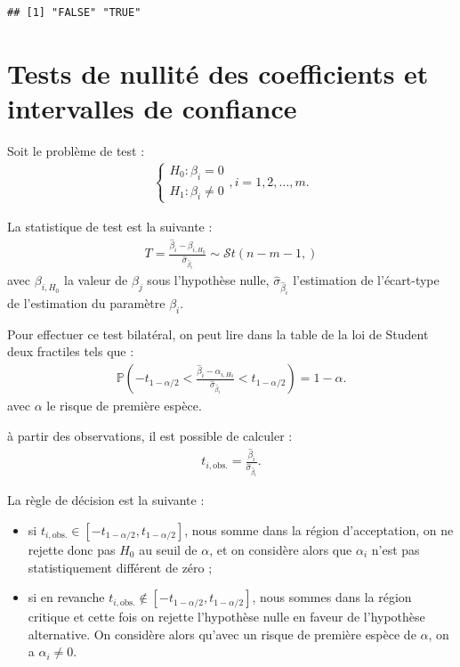 \documentclass[
  11pt,
]{book}
\providecommand{\tightlist}{%
  \setlength{\itemsep}{0pt}\setlength{\parskip}{0pt}}
\numberwithin{equation}{section}
\numberwithin{countremarque}{section}
\begin{document}
\begin{lstlisting}
## [1] "FALSE" "TRUE"
\end{lstlisting}

\hypertarget{regressions_tests}{%
\section{Tests de nullité des coefficients et intervalles de confiance}\label{regressions_tests}}

Soit le problème de test :
\begin{align*}
  \begin{cases}
        H_0 : \beta_i = 0\\
        H_1 : \beta_i \ne 0
    \end{cases}, i = 1, 2, \ldots, m.
\end{align*}

La statistique de test est la suivante :
\begin{align*}
  T = \frac{\hat{\beta}_i - \beta_{i,H_0}}{\hat{\sigma}_{\hat{\beta}_i}} \sim \mathcal{S}t(n-m-1,)
\end{align*}
avec \(\beta_{i,H_0}\) la valeur de \(\beta_j\) sous l'hypothèse nulle, \(\hat{\sigma}_{\hat{\beta}_i}\) l'estimation de l'écart-type de l'estimation du paramètre \(\beta_i\).

Pour effectuer ce test bilatéral, on peut lire dans la table de la loi de Student deux fractiles tels que :
\begin{align*}
    \mathbb{P}\left( -t_{1-\alpha/2} < \frac{\hat{\beta}_i - \alpha_{i,H_0}}{\hat{\sigma}_{\hat{\beta}_i}} < t_{1-\alpha/2} \right) = 1 - \alpha.
\end{align*}
avec \(\alpha\) le risque de première espèce.

à partir des observations, il est possible de calculer :
\begin{align*}
  t_{i,\textrm{obs.}} = \frac{\hat{\beta}_i}{\hat{\sigma}_{\hat{\beta}_i}}.
\end{align*}

La règle de décision est la suivante :

\begin{itemize}
\tightlist
\item
  si \(t_{i,\textrm{obs.}} \in [-t_{1-\alpha/2}, t_{1-\alpha/2}]\), nous somme dans la région d'acceptation, on ne rejette donc pas \(H_0\) au seuil de \(\alpha\), et on considère alors que \(\alpha_i\) n'est pas statistiquement différent de zéro ;
\item
  si en revanche \(t_{i,\textrm{obs.}} \notin [-t_{1-\alpha/2}, t_{1-\alpha/2}]\), nous sommes dans la région critique et cette fois on rejette l'hypothèse nulle en faveur de l'hypothèse alternative. On considère alors qu'avec un risque de première espèce de \(\alpha\), on a \(\alpha_i \ne 0\).
\end{itemize}
\end{document}
